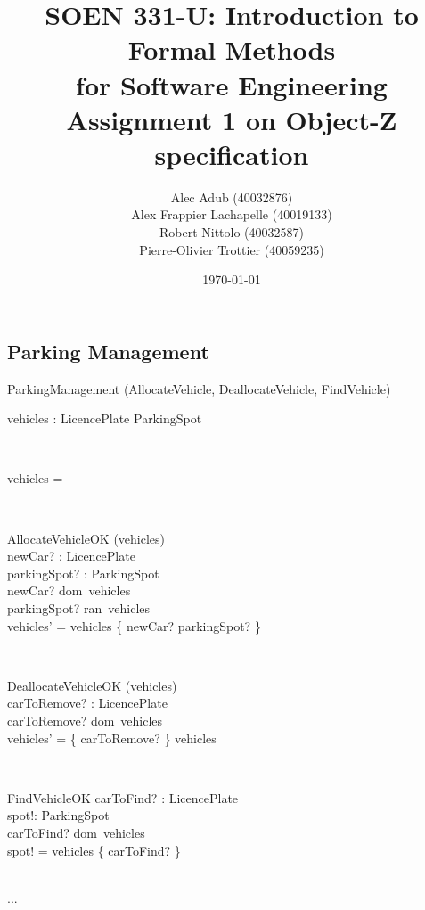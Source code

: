 \documentclass[12pt]{article}
\title{SOEN 331-U: Introduction to Formal Methods\\for Software Engineering\\
Assignment 1 on Object-Z specification}
\author{\begin{tabular}{c}
Alec Adub (40032876) \tabularnewline
Alex Frappier Lachapelle (40019133) \tabularnewline
Robert Nittolo (40032587) \tabularnewline
Pierre-Olivier Trottier (40059235) \tabularnewline\\
\end{tabular}
}
\date{\today}
\begin{document}
\begin{spacing}{1.5}

\maketitle

\newpage

\section{Parking Management}

\begin{class}{ParkingManagement}
\also
\upharpoonright (AllocateVehicle, DeallocateVehicle, FindVehicle) \\
\begin{state}
vehicles : LicencePlate  \rightarrowtail ParkingSpot\\
\where
\end{state} \\
\begin{init}
vehicles = \emptyset %
\end{init} \\
\begin{op}{AllocateVehicleOK}
\Delta (vehicles) \\
newCar? : LicencePlate\\
parkingSpot? : ParkingSpot\\
\ST
newCar? \notin dom~vehicles\\
parkingSpot? \notin ran~vehicles\\
vehicles' = vehicles \union \{ newCar? \rightarrowtail parkingSpot? \}
\end{op}\\
\begin{op}{DeallocateVehicleOK}
\Delta (vehicles) \\
carToRemove? : LicencePlate\\
\ST
carToRemove? \in dom~vehicles\\
vehicles' = \{ carToRemove? \} \ndres vehicles
\end{op}\\
\begin{op}{FindVehicleOK}
carToFind? : LicencePlate\\
spot!: ParkingSpot\\
\ST
carToFind? \in dom~vehicles\\
spot! = vehicles \{ carToFind? \}
\end{op}\\
...\\
\end{class}


\end{spacing}
\end{document}
